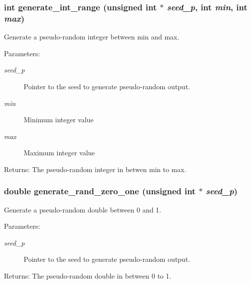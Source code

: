 \subsubsection{\setlength{\rightskip}{0pt plus 5cm}int generate\_\-int\_\-range (unsigned int $\ast$ {\em seed\_\-p}, int {\em min}, int {\em max})}\label{misc_8h_adb19b68c0714b2ce3c5e2a103152acb}


Generate a pseudo-random integer between min and max.

\begin{Desc}
\item[Parameters:]
\begin{description}
\item[{\em seed\_\-p}]Pointer to the seed to generate pseudo-random output. \item[{\em min}]Minimum integer value \item[{\em max}]Maximum integer value \end{description}
\end{Desc}
\begin{Desc}
\item[Returns:]The pseudo-random integer in betwen min to max. \end{Desc}
\subsubsection{\setlength{\rightskip}{0pt plus 5cm}double generate\_\-rand\_\-zero\_\-one (unsigned int $\ast$ {\em seed\_\-p})}\label{misc_8h_ddd7f41419e9150ac21b2d8ba544fa50}


Generate a pseudo-random double between 0 and 1.

\begin{Desc}
\item[Parameters:]
\begin{description}
\item[{\em seed\_\-p}]Pointer to the seed to generate pseudo-random output. \end{description}
\end{Desc}
\begin{Desc}
\item[Returns:]The pseudo-random double in between 0 to 1. \end{Desc}

